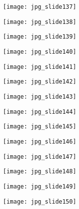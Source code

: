 \documentclass[main.tex]{subfiles}
\begin{document}
\begin{center}
\texttt{[image: jpg\_slide137]}
\end{center}

\begin{center}
\texttt{[image: jpg\_slide138]}
\end{center}

\begin{center}
\texttt{[image: jpg\_slide139]}
\end{center}

\begin{center}
\texttt{[image: jpg\_slide140]}
\end{center}

\begin{center}
\texttt{[image: jpg\_slide141]}
\end{center}

\begin{center}
\texttt{[image: jpg\_slide142]}
\end{center}

\begin{center}
\texttt{[image: jpg\_slide143]}
\end{center}

\begin{center}
\texttt{[image: jpg\_slide144]}
\end{center}

\begin{center}
\texttt{[image: jpg\_slide145]}
\end{center}

\begin{center}
\texttt{[image: jpg\_slide146]}
\end{center}

\begin{center}
\texttt{[image: jpg\_slide147]}
\end{center}

\begin{center}
\texttt{[image: jpg\_slide148]}
\end{center}

\begin{center}
\texttt{[image: jpg\_slide149]}
\end{center}

\begin{center}
\texttt{[image: jpg\_slide150]}
\end{center}
\end{document}
